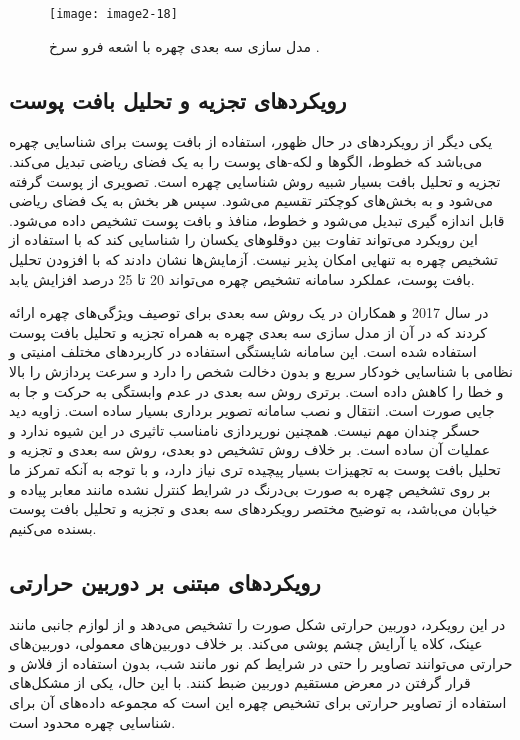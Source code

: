 \begin{figure}[h]
\centering
  \texttt{[image: image2-18]}
  \caption{مدل سازی سه بعدی چهره با اشعه فرو سرخ \cite{ref1}.}
  \label{image2-15}
\end{figure}
 
 \subsection{رویکرد‌های تجزیه و تحلیل بافت پوست}
یکی دیگر از رویکردهای در حال ظهور، استفاده از بافت پوست برای شناسایی چهره می‌باشد که خطوط، الگوها و لکه-های پوست را به یک فضای ریاضی تبدیل می‌کند. تجزیه و تحلیل بافت بسیار شبیه روش شناسایی چهره است. تصویری از پوست گرفته می‌شود و به بخش‌های کوچکتر تقسیم می‌شود. سپس هر بخش به یک فضای ریاضی قابل اندازه گیری تبدیل می‌شود و خطوط، منافذ و بافت پوست تشخیص داده می‌شود. این رویکرد می‌تواند تفاوت بین دوقلوهای یکسان را شناسایی کند که با استفاده از تشخیص چهره به تنهایی امکان پذیر نیست. آزمایش‌ها نشان دادند که با افزودن تحلیل بافت پوست، عملکرد سامانه تشخیص چهره می‌تواند 20 تا 25 درصد افزایش یابد.

\noindent
در سال 2017  و همکاران در \cite{HU2017366} یک روش سه بعدی برای توصیف ویژگی‌های چهره ارائه کردند که در آن از مدل سازی سه بعدی چهره به همراه تجزیه و تحلیل بافت پوست استفاده شده است. این سامانه شایستگی استفاده در کاربردهای مختلف امنیتی و نظامی با شناسایی خودکار سریع و بدون دخالت شخص را دارد و سرعت پردازش را بالا و خطا را کاهش داده است. برتری روش سه بعدی در عدم وابستگی به حرکت و جا به جایی صورت است. انتقال و نصب سامانه تصویر برداری بسیار ساده است. زاویه دید حسگر چندان مهم نیست. همچنین نورپردازی نامناسب تاثیری در این شیوه ندارد و عملیات آن ساده است.
بر خلاف روش تشخیص دو بعدی، روش سه بعدی و تجزیه و تحلیل بافت پوست به تجهیزات بسیار پیچیده تری نیاز دارد، و با توجه به آنکه تمرکز ما بر روی تشخیص چهره به صورت بی‌درنگ در شرایط کنترل نشده مانند معابر پیاده و خیابان می‌باشد، به توضیح مختصر رویکردهای سه بعدی و تجزیه و تحلیل بافت پوست بسنده می‌کنیم.

\subsection{رویکرد‌های مبتنی بر دوربین حرارتی}
در این رویکرد، دوربین حرارتی شکل صورت را تشخیص می‌دهد و از لوازم جانبی مانند عینک، کلاه یا آرایش چشم پوشی می‌کند. بر خلاف دوربین‌های معمولی، دوربین‌های حرارتی می‌توانند تصاویر را حتی در شرایط کم نور مانند شب، بدون استفاده از فلاش و قرار گرفتن در معرض مستقیم دوربین ضبط کنند. با این حال، یکی از مشکل‌های استفاده از تصاویر حرارتی برای تشخیص چهره این است که مجموعه داده‌های آن برای شناسایی چهره محدود است.


